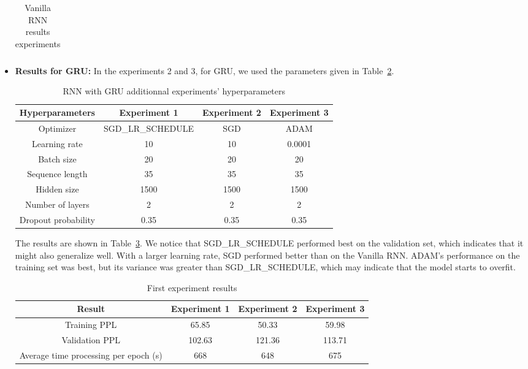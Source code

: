 \begin{itemize}
\begin{table}[H]
\begin{tabular}{||c c c c||}
			\hline
		\end{tabular}
		\caption{Vanilla RNN results experiments}
		\label{table:3.1}
	\end{table}
	\item[2)] \textbf{Results for GRU:}
	In the experiments 2 and 3, for GRU, we used the parameters given in Table~\ref{table:4}.\\
	\begin{table}[H]
		\centering
		\begin{tabular}{||c c c c||} 
			\hline
			\textbf{Hyperparameters} &\textbf{Experiment 1} & \textbf{Experiment 2} & \textbf{Experiment 3}\\[0.5ex] 
			\hline
			Optimizer & SGD\_LR\_SCHEDULE & SGD & ADAM \\
			Learning rate & 10 & 10 & 0.0001   \\
			Batch size & 20 & 20 &20 \\
			Sequence length & 35 & 35 & 35\\
			Hidden size & 1500 & 1500 & 1500 \\
			Number of layers & 2 & 2 & 2 \\
			Dropout probability & 0.35 & 0.35 &0.35 \\[1ex]
			\hline
		\end{tabular}
		\caption{RNN with GRU additionnal experiments' hyperparameters}
		\label{table:4}
	\end{table}
	The results are shown in Table~\ref{table:4.1}. We notice that SGD\_LR\_SCHEDULE performed best on the validation set, which indicates that it might also generalize well.  With a larger learning rate, SGD performed better than on the Vanilla RNN. ADAM's performance on the training set was best, but its variance was greater than SGD\_LR\_SCHEDULE, which may indicate that the model starts to overfit.
	\begin{table}[H]
		\centering
		\begin{tabular}{||c c c c||} 
			\hline
			\textbf{Result} & \textbf{Experiment 1} & \textbf{Experiment 2}& \textbf{Experiment 3} \\[0.5ex] 
			\hline
			Training PPL & 65.85& 50.33& 59.98 \\
			Validation PPL & 102.63 & 121.36 & 113.71  \\
			Average time processing per epoch (s) & 668 & 648 & 675 \\[1ex]
			\hline
		\end{tabular}
		\caption{First experiment results}
		\label{table:4.1}
	\end{table}

\end{itemize}
